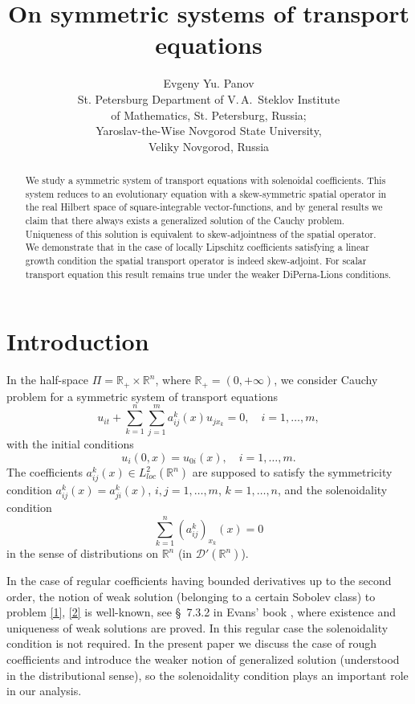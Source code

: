 \documentclass[12pt]{article}
\date{}
\title{On symmetric systems of transport equations}
\author{Evgeny Yu. Panov \\
St. Petersburg Department of V.\,A.~Steklov Institute \\ of Mathematics,
St. Petersburg, Russia; \\
Yaroslav-the-Wise Novgorod State University, \\ Veliky Novgorod, Russia}%
\theoremstyle{plain}
\theoremstyle{definition}
\numberwithin{equation}{section}
\newcommand{\R}{{\mathbb R}}
\newcommand{\D}{{\mathcal D}}
\begin{document}
\maketitle

\begin{abstract}
We study a symmetric system of transport equations with solenoidal coefficients. This system reduces to an evolutionary equation with a skew-symmetric spatial operator in the real Hilbert space of square-integrable vector-functions, and by general results we claim that there always exists a generalized solution of the Cauchy problem. Uniqueness of this solution is equivalent to skew-adjointness of the spatial operator. We demonstrate that in the case of locally Lipschitz coefficients satisfying a linear growth condition the spatial transport operator is indeed skew-adjoint. For scalar transport equation this result remains true under the weaker DiPerna-Lions conditions.
\end{abstract}

\section{Introduction}
\small
In the half-space $\Pi=\R_+\times\R^n$, where $\R_+=(0,+\infty)$, we consider Cauchy problem for a symmetric system of transport equations
\begin{equation}\label{1}
u_{it}+\sum_{k=1}^n\sum_{j=1}^m a^k_{ij}(x)u_{jx_k}=0, \quad i=1,\ldots,m,
\end{equation}
with the initial conditions
\begin{equation}\label{2}
u_i(0,x)=u_{0i}(x), \quad i=1,\ldots,m.
\end{equation}
The coefficients $a^k_{ij}(x)\in L^2_{loc}(\R^n)$ are supposed to satisfy the symmetricity condition  $a^k_{ij}(x)=a^k_{ji}(x)$, $i,j=1,\ldots,m$, $k=1,\ldots,n$, and the solenoidality condition
\begin{equation}\label{sol}
\sum_{k=1}^n (a^k_{ij})_{x_k}(x)=0
\end{equation}
in the sense of distributions on $\R^n$ (in $\D'(\R^n)$).

In the case of regular coefficients having bounded derivatives up to the second order, the notion of weak solution (belonging to a certain Sobolev class) to problem \eqref{1}, \eqref{2} is well-known, see \S~7.3.2 in Evans' book \cite{Evans}, where existence and uniqueness of weak solutions are proved. In this regular case the solenoidality
condition is not required. In the present paper we discuss the case of rough coefficients and introduce the weaker notion of generalized solution (understood in the distributional sense), so the solenoidality condition plays an important role in our analysis.
\end{document}
